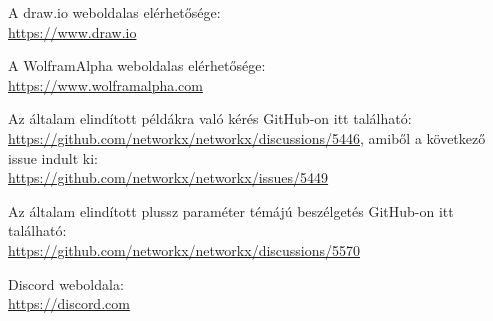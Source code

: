 \documentclass[
]{thesis-ekf}
\theoremstyle{definition}
\theoremstyle{remark}
\begin{document}
\begin{thebibliography}{2}
	A draw.io weboldalas elérhetősége:
	\\\url{https://www.draw.io}
	
	A WolframAlpha weboldalas elérhetősége:
	\\\url{https://www.wolframalpha.com}
	
	Az általam elindított példákra való kérés GitHub-on itt található:
	\\\url{https://github.com/networkx/networkx/discussions/5446}, amiből a következő issue indult ki:
	\\\url{https://github.com/networkx/networkx/issues/5449}	
	
	Az általam elindított plussz paraméter témájú beszélgetés GitHub-on itt található:
	\\\url{https://github.com/networkx/networkx/discussions/5570}%

	Discord weboldala:
	\\\url{https://discord.com}
\end{thebibliography}
	
	
\end{document}
